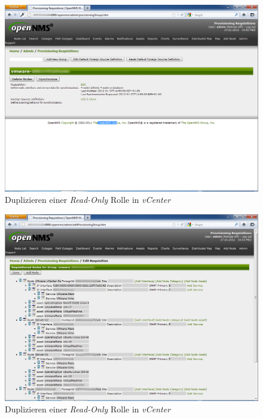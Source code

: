\begin{figure}[H]
	\centering
	\includegraphics[width=1.0\textwidth]{images/3rd-party/vmware/5-provisioning}
	\caption{Duplizieren einer \emph{Read-Only} Rolle in \emph{vCenter}}
	\label{pic:vmware-provisioning}
\end{figure}

\begin{figure}[H]
	\centering
	\includegraphics[width=1.0\textwidth]{images/3rd-party/vmware/6-group}
	\caption{Duplizieren einer \emph{Read-Only} Rolle in \emph{vCenter}}
	\label{pic:vmware-group}
\end{figure}

